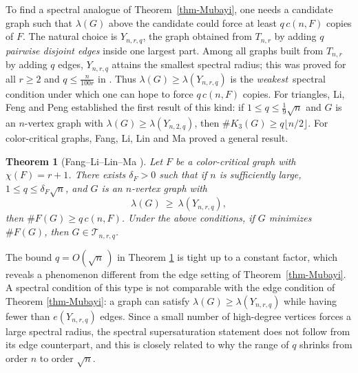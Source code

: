 \documentclass[11pt,a4paper]{article}
\newtheorem{theorem}{Theorem}[section]
\theoremstyle{definition}
\theoremstyle{plain}
\renewcommand{\le}{\leqslant}
\renewcommand{\ge}{\geqslant}
\begin{document}
\smallskip 
To find a spectral analogue of Theorem~\ref{thm-Mubayi},
one needs a candidate graph such that  $\lambda (G)$ above the candidate could force at least $q\,c(n,F)$ copies of $F$. The
natural choice is $Y_{n,r,q}$, the graph obtained from
$T_{n,r}$ by adding $q$ \textit{pairwise
disjoint edges} inside one largest part. 
Among all graphs 
built from $T_{n,r}$ by adding $q$ edges, $Y_{n,r,q}$ attains 
the smallest spectral radius; this was proved for all $r\ge2$ and
$q\le \frac{n}{100r}$ in \cite{FLLM2025}. 
Thus $\lambda(G)\ge\lambda(Y_{n,r,q})$ is the {\it weakest}\, spectral
condition under which one can hope to force $q\,c(n,F)$
copies. For triangles, Li, Feng and Peng
\cite{LFP2024} established the first result of this kind:
if $1\le q\le\frac{1}{9}\sqrt n$ and $G$ is an $n$-vertex graph
with $\lambda(G)\ge\lambda(Y_{n,2,q})$, then
$\texttt{\#}K_3(G)\ge q\lfloor n/2\rfloor$. 
For color-critical graphs, Fang, Li, Lin and Ma \cite{FLLM2025} proved a general result. 



\begin{theorem}[Fang--Li--Lin--Ma \cite{FLLM2025}] \label{thm-Y}
    Let $F$ be a color-critical graph
with $\chi (F)=r+1$. There exists $\delta_F >0$ such that 
if $n$ is sufficiently large, $1\le q \le  \delta_F \sqrt{n}$, 
and $G$ is an $n$-vertex graph with
\begin{equation*} 
     \lambda (G) \ \ge  \ 
      \lambda (Y_{n,r,q}), 
\end{equation*}
then $\texttt{\#} F(G) \ge q\, c(n,F)$.
Under the above conditions, if $G$ minimizes $\texttt{\#} F(G)$, then $G\in \mathcal{T}_{n,r,q}$.
\end{theorem}


The bound $q=O(\sqrt{n}\,)$  in Theorem \ref{thm-Y} is tight up to a constant factor, which reveals a
phenomenon different from the edge setting of Theorem~\ref{thm-Mubayi}. 
A spectral condition of this type is not comparable with the edge condition of Theorem \ref{thm-Mubayi}: a graph can satisfy $\lambda(G)\ge\lambda(Y_{n,r,q})$ while having fewer than $e(Y_{n,r,q})$ edges. 
Since a small number of high-degree vertices forces a large spectral radius, the spectral supersaturation statement does not follow from its edge counterpart, and this is closely related to why the range of $q$ shrinks from order $n$ to order $\sqrt n$.  
\end{document}
